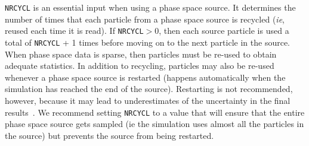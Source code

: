 \documentclass[12pt,twoside]{article}      %
\begin{document}
{\tt NRCYCL} is an essential input when using a phase space source. It
determines the number of times that each particle from a phase space
source is recycled ({\em  ie}, reused each time it is read).
If {\tt NRCYCL}$>$0, then
each source particle is used a total of {\tt NRCYCL} + 1 times
before moving on to the next particle in the source.
When phase space data is sparse, then particles must be re-used to obtain
adequate statistics.  In addition to recycling, particles may also
be re-used whenever a phase space source is restarted
(happens automatically when the simulation has reached
the end of the source).  Restarting is not recommended, however,
because it may lead to underestimates of the uncertainty in the
final results~\cite{Wa02a}.  We recommend setting {\tt NRCYCL} to a value
that will ensure that the entire phase space source gets sampled (ie
the simulation uses almost all the particles in the source) but
prevents the source from being restarted.
\end{document}
